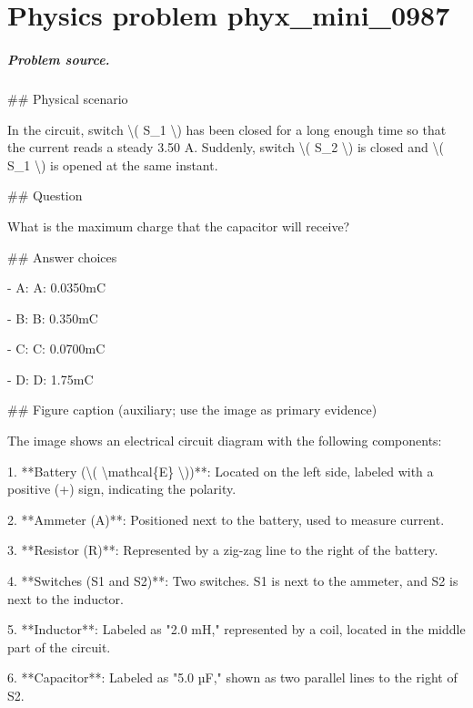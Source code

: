 
\chapter{Physics problem phyx\_mini\_0987}
\label{ch:PhyXMiniProblems_problem_phyx_mini_0987}

\paragraph{Problem source.}
\#\# Physical scenario

In the circuit, switch \textbackslash{}( S\_1 \textbackslash{}) has been closed for a long enough time so that the current reads a steady 3.50 A. Suddenly, switch \textbackslash{}( S\_2 \textbackslash{}) is closed and \textbackslash{}( S\_1 \textbackslash{}) is opened at the same instant.

\#\# Question

What is the maximum charge that the capacitor will receive?

\#\# Answer choices

- A: A: 0.0350mC

- B: B: 0.350mC

- C: C: 0.0700mC

- D: D: 1.75mC

\#\# Figure caption (auxiliary; use the image as primary evidence)

The image shows an electrical circuit diagram with the following components:

1. **Battery (\textbackslash{}( \textbackslash{}mathcal\{E\} \textbackslash{}))**: Located on the left side, labeled with a positive (+) sign, indicating the polarity.

2. **Ammeter (A)**: Positioned next to the battery, used to measure current.

3. **Resistor (R)**: Represented by a zig-zag line to the right of the battery.

4. **Switches (S1 and S2)**: Two switches. S1 is next to the ammeter, and S2 is next to the inductor.

5. **Inductor**: Labeled as "2.0 mH," represented by a coil, located in the middle part of the circuit.

6. **Capacitor**: Labeled as "5.0 µF," shown as two parallel lines to the right of S2.

